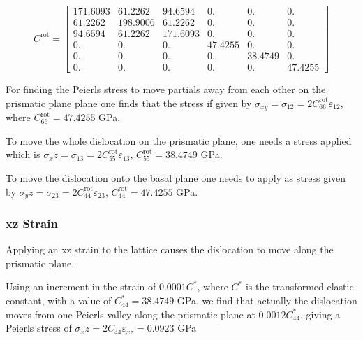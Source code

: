 \documentclass[11pt]{article}
\begin{document}
\begin{equation*}
 C^{\text{rot}}=	
  \begin{bmatrix}
   171.6093 &  61.2262 &  94.6594 &   0.     &   0.      &  0.      \\
    61.2262 & 198.9006 &  61.2262 &   0.     &   0.      &  0.      \\
    94.6594 &  61.2262 & 171.6093 &   0.     &   0.      &  0.      \\
     0.     &   0.     &   0.     &  47.4255 &   0.      &  0.      \\
     0.     &   0.     &   0.     &   0.     &  38.4749  &  0.      \\
     0.     &   0.     &   0.     &   0.     &   0.      & 47.4255  
  \end{bmatrix}
\end{equation*}



For finding the Peierls stress to move partials away from each
other on the prismatic plane plane one finds that the stress if
given by \(\sigma_{xy} = \sigma_{12} =  2C_{66}^{\text{rot}}\varepsilon_{12}\), where \(C_{66}^{\text{rot}} =
    47.4255\) GPa.

To move the whole dislocation on the prismatic plane, one needs a
stress applied which is \(\sigma_xz = \sigma_{13} = 2C_{55}^{\text{rot}}\varepsilon_{13}\), \(C_{55}^{\text{rot}} =
    38.4749\) GPa.

To move the dislocation onto the basal plane one needs to apply as
stress given by \(\sigma_yz = \sigma_{23} = 2C_{44}^{\text{rot}}\varepsilon_{23}\), \(C_{44}^{\text{rot}} =
    47.4255\) GPa.



\subsubsection{xz Strain}
\label{sec:org771c593}

Applying an xz strain to the lattice causes the dislocation to
move along the prismatic plane. 

Using an increment in the strain of \(0.0001C^{*}\), where \(C^{*}\) is
the transformed elastic constant, with a value of \(C_{44}^{*}=38.4749\)
GPa, we find that actually the dislocation moves from one Peierls
valley along the prismatic plane at \(0.0012C_{44}^{*}\), giving a Peierls
stress of \(\sigma_xz = 2C_{44}\varepsilon_{xz} = 0.0923\) GPa
\end{document}
